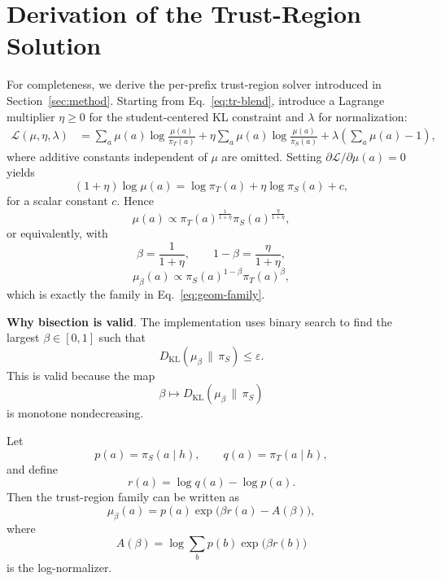 \documentclass{llmxive}
\providecommand{\paragraph}[1]{\vspace{1mm}\noindent\textbf{#1}.}
\begin{document}
\section{Derivation of the Trust-Region Solution}
\label{app:effective_objective}

For completeness, we derive the per-prefix trust-region solver introduced in Section~\ref{sec:method}.
Starting from Eq.~\ref{eq:tr-blend}, introduce a Lagrange multiplier $\eta \ge 0$ for the student-centered KL constraint and $\lambda$ for normalization:
\begin{equation}
\begin{split}
\mathcal{L}(\mu,\eta,\lambda)
&=
\sum_a \mu(a)\log\frac{\mu(a)}{\pi_T(a)}
+ \eta \sum_a \mu(a)\log\frac{\mu(a)}{\pi_S(a)}
+ \lambda \left(\sum_a \mu(a)-1\right),
\end{split}
\end{equation}
where additive constants independent of $\mu$ are omitted.
Setting $\partial \mathcal{L}/\partial \mu(a)=0$ yields
\begin{equation*}
(1+\eta)\log \mu(a)
=
\log \pi_T(a)+\eta \log \pi_S(a)+c,
\end{equation*}
for a scalar constant $c$.
Hence
\begin{equation*}
\mu(a)
\propto
\pi_T(a)^{\frac{1}{1+\eta}}
\pi_S(a)^{\frac{\eta}{1+\eta}},
\end{equation*}
or equivalently, with
\[
\beta = \frac{1}{1+\eta},
\qquad
1-\beta = \frac{\eta}{1+\eta},
\]
\begin{equation}
\mu_\beta(a)
\propto
\pi_S(a)^{1-\beta}\pi_T(a)^\beta,
\end{equation}
which is exactly the family in Eq.~\ref{eq:geom-family}.

\paragraph{Why bisection is valid}
The implementation uses binary search to find the largest $\beta \in [0,1]$ such that
\[
D_{\mathrm{KL}}(\mu_\beta \,\|\, \pi_S) \le \varepsilon.
\]
This is valid because the map
\[
\beta \mapsto D_{\mathrm{KL}}(\mu_\beta \,\|\, \pi_S)
\]
is monotone nondecreasing.

Let
\[
p(a)=\pi_S(a \mid h),
\qquad
q(a)=\pi_T(a \mid h),
\]
and define
\[
r(a)=\log q(a)-\log p(a).
\]
Then the trust-region family can be written as
\begin{equation}
\mu_\beta(a)
=
p(a)\exp\!\bigl(\beta r(a)-A(\beta)\bigr),
\end{equation}
where
\begin{equation}
A(\beta)
=
\log \sum_b p(b)\exp\!\bigl(\beta r(b)\bigr)
\end{equation}
is the log-normalizer.
\end{document}
